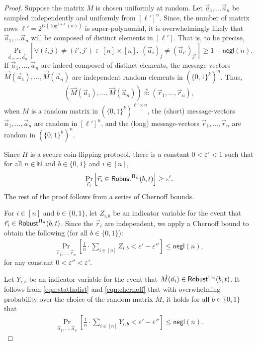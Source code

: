 \documentclass[11pt,letterpaper]{article}
\theoremstyle{plain}
\theoremstyle{definition}
\newcommand{\NN}{\mathbb{N}}
\newcommand{\eps}{\varepsilon}
\newcommand{\negl}{\mathsf{negl}}
\newcommand{\statIndist}{\overset{s}{\approx}}
\begin{document}
\begin{proof}
Suppose the matrix $M$ is chosen uniformly at random. Let $\vec{a}_1,\dots\vec{a}_n$ be sampled independently and uniformly from $[\ell']^n$.
Since, the number of matrix rows $\ell'=2^{O(\log^{1+\delta}(n))}$ is super-polynomial,
it is overwhelmingly likely that $\vec{a}_1,\dots\vec{a}_n$ will be composed of distinct elements in $[\ell']$. 
That is, to be precise, 
$$\Pr_{\vec{a}_1,\dots,\vec{a}_n}\left[\forall (i,j)\neq(i',j')\in[n]\times[n], ~ (\vec{a}_i)_j \neq (\vec{a}_{i'})_{j'}\right]\geq 1-\negl(n).$$
If $\vec{a}_1,\dots,\vec{a}_n$ are indeed composed of distinct elements, the message-vectors
$\vec{M}(\vec{a}_1),\dots,\vec{M}(\vec{a}_n)$ are independent random elements in $(\{0,1\}^k)^n$.
Thus,
\begin{align}\label{eqn:statIndist}
(\vec{M}(\vec{a}_1),\dots,\vec{M}(\vec{a}_n))\statIndist(\vec{r}_1,\dots,\vec{r}_n),
\end{align}
when $M$ is a random matrix in $(\{0,1\}^k)^{\ell'\times n}$, 
the (short) message-vectors $\vec{a}_1,\dots,\vec{a}_n$ are random in $[\ell']^n$, 
and the (long) message-vectors $\vec{r}_1,\dots,\vec{r}_n$ are random in $(\{0,1\}^k)^n$.


Since $\Pi$ is a secure coin-flipping protocol, there is a constant $0<\eps'<1$ such that for all $n\in\NN$ and $b\in\{0,1\}$ and $i\in[n]$,
$$\Pr_{\vec{r}_i}\left[\vec{r}_i\in\Robust^{\Pi_n}(b,t)\right]\geq\eps'.$$
The rest of the proof follows from a series of Chernoff bounds.

For $i\in[n]$ and $b\in\{0,1\}$, let $Z_{i,b}$ be an indicator variable for the event that $\vec{r}_i\in{\sf Robust}^{\Pi_n}(b,t)$.
Since the $\vec{r}_i$ are independent, we apply a Chernoff bound to obtain the following (for all $b\in\{0,1\}$):
\begin{align}\label{eqn:chernoff}
\Pr_{\vec{r}_1,\dots,\vec{r}_n}\left[\frac{1}{n}\cdot\sum_{i\in[n]}Z_{i,b}<\eps'- \eps''\right]\leq \negl(n),
\end{align}
for any constant $0<\eps''<\eps'$. 

Let $Y_{i,b}$ be an indicator variable for the event that $\vec{M}(\vec{a}_i)\in{\sf Robust}^{\Pi_n}(b,t)$.
It follows from \eqref{eqn:statIndist} and \eqref{eqn:chernoff} that with overwhelming probability over the choice of the random matrix $M$, 
it holds for all $b\in\{0,1\}$ that 
\begin{align}\label{eqn:chernoffSet}
\Pr_{\vec{a}_1,\dots,\vec{a}_n}\left[\frac{1}{n}\cdot\sum_{i\in[n]}Y_{i,b}<\eps'- \eps''\right]\leq \negl(n).
\end{align}


\end{proof}
\end{document}
